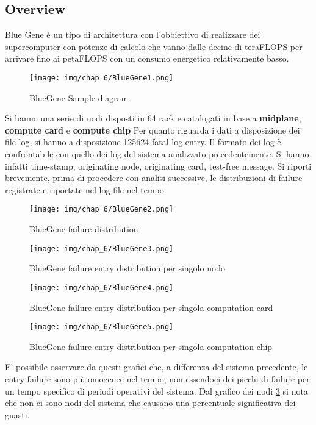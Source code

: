 \subsection{Overview}
Blue Gene è un tipo di architettura con l'obbiettivo di realizzare dei supercomputer con potenze di calcolo che vanno dalle decine di teraFLOPS per arrivare fino ai petaFLOPS con un consumo energetico relativamente basso.
 \begin{figure}[H]
	\centering
	\texttt{[image: img/chap\_6/BlueGene1.png]}
	\caption{BlueGene Sample diagram}
	\label{fig:BlueGeneSamplediagram}
\end{figure}
\noindent
Si hanno una serie di nodi disposti in 64 rack e catalogati in base a \textbf{midplane}, \textbf{compute card} e \textbf{compute chip}
Per quanto riguarda i dati a disposizione dei file log, si hanno a disposizione 125624 fatal log entry.
Il formato dei log è confrontabile con quello dei log del sistema analizzato precedentemente.
Si hanno infatti time-stamp, originating node, originating card, test-free message.
Si riporti brevemente, prima di procedere con analisi successive, le distribuzioni di  failure registrate e riportate nel log file nel tempo.
 \begin{figure}[H]
	\centering
	\texttt{[image: img/chap\_6/BlueGene2.png]}
	\caption{BlueGene failure distribution}
	\label{fig:Bg failure distr}
\end{figure}
 \begin{figure}[H]
	\centering
	\texttt{[image: img/chap\_6/BlueGene3.png]}
	\caption{BlueGene failure entry distribution per singolo nodo}
	\label{fig:Bg failure distr sing nod}
\end{figure}
 \begin{figure}[H]
	\centering
	\texttt{[image: img/chap\_6/BlueGene4.png]}
	\caption{BlueGene failure entry distribution per singola computation card}
	\label{fig:Bg failure distr sing comp card}
\end{figure}
 \begin{figure}[H]
	\centering
	\texttt{[image: img/chap\_6/BlueGene5.png]}
	\caption{BlueGene failure entry distribution per singola computation chip}
	\label{fig:Bg failure distr sing comp chip}
\end{figure}
\noindent
E' possibile osservare da questi grafici che, a differenza del sistema precedente, le entry failure sono più omogenee nel tempo, non essendoci dei picchi di failure per un tempo specifico di periodi operativi del sistema.
Dal grafico dei nodi \ref{fig:Bg failure distr sing nod} si nota che non ci sono nodi del sistema che causano una percentuale significativa dei guasti.

